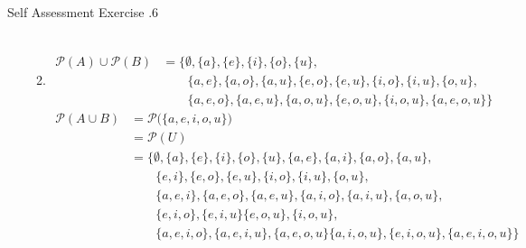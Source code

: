 \documentclass[../notes.tex]{subfiles}
\begin{document}
\begin{exercise}{Self Assessment Exercise \thechapter.6}
\begin{enumerate}
\begin{enumerate}[label=(\alph*)]
\begin{align*}
                \end{align*}
              \item \rule{0pt}{11pt} \vspace*{-25pt}
                \begin{align*}
                  \mathcal{P}(A) \cup \mathcal{P}(B) &= \bigl\{\emptyset, \{a\}, \{e\}, \{i\}, \{o\}, \{u\},\\
                  & \qquad \{a, e\}, \{a, o\}, \{a, u\}, \{e, o\}, \{e, u\}, \{i, o\}, \{i, u\}, \{o, u\}, \\
                  & \qquad \{a, e, o\}, \{a, e, u\}, \{a, o, u\}, \{e, o, u\}, \{i, o, u\}, \{a, e, o, u\}\bigr\}
                \end{align*}
                \begin{align*}
                  \mathcal{P}(A \cup B) &= \mathcal{P}\bigl(\{a, e, i, o, u\}\bigr)\\
                  &= \mathcal{P}(U)\\
                  &= \bigl\{\emptyset, \{a\}, \{e\}, \{i\}, \{o\}, \{u\}, \{a, e\}, \{a, i\}, \{a, o\}, \{a, u\},\\
                  & \qquad \{e, i\}, \{e, o\}, \{e, u\}, \{i, o\}, \{i, u\}, \{o, u\},\\
                  & \qquad \{a, e, i\}, \{a, e, o\}, \{a, e, u\}, \{a, i, o\}, \{a, i, u\}, \{a, o, u\},\\
                  & \qquad \{e, i, o\}, \{e, i, u\} \{e, o, u\}, \{i, o, u\},\\
                  & \qquad \{a, e, i, o\}, \{a, e, i, u\}, \{a, e, o, u\} \{a, i, o, u\}, \{e, i, o, u\}, \{a, e, i, o, u\}\bigr\}
                \end{align*}
            \end{enumerate}
        \end{enumerate}
      \end{exercise}
\end{document}
